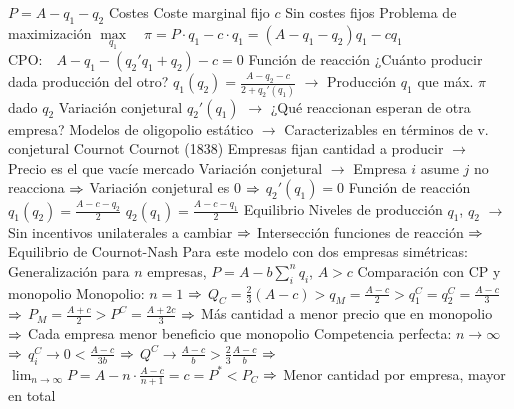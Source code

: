 \documentclass{nuevotema}
\begin{document}
\begin{esquemal}
				\4[] $P = A - q_1 - q_2$
				\4 Costes
				\4[] Coste marginal fijo $c$
				\4[] Sin costes fijos
				\4 Problema de maximización
				\4[] $\underset{q_1}{\max} \quad \pi = P \cdot q_1 - c\cdot q_1 = (A-q_1 - q_2) q_1 - c q_1 $
				\4[] $\text{CPO:} \quad A - q_1 - (q_2'q_1 + q_2) -c =0$
				\4 Función de reacción
				\4[] ¿Cuánto producir dada producción del otro?
				\4[] $q_1(q_2) = \frac{A - q_2 - c}{2 + q_2'(q_1)}$
				\4[] $\to$ Producción $q_1$ que máx. $\pi$ dado $q_2$
				\4 Variación conjetural $q_2'(q_1)$
				\4[] $\to$ ¿Qué reaccionan esperan de otra empresa?
				\4[$\then$] Modelos de oligopolio estático
				\4[] $\to$ Caracterizables en términos de v. conjetural
			\3 Cournot
				\4 Cournot (1838)
				\4 Empresas fijan cantidad a producir
				\4[] $\to$ Precio es el que vacíe mercado
				\4 Variación conjetural
				\4[] $\to$ Empresa $i$ asume $j$ no reacciona
				\4[] $\then$ Variación conjetural es 0
				\4[] $\then$ $q_2'(q_1) = 0$
				\4 Función de reacción
				\4[] $q_1(q_2) = \frac{A - c - q_2}{2}$
				\4[] $q_2(q_1) = \frac{A - c - q_1}{2}$
				\4[] 
				\4 Equilibrio
				\4[] Niveles de producción $q_1$, $q_2$
				\4[] $\to$ Sin incentivos unilaterales a cambiar
				\4[] $\then$ Intersección funciones de reacción
				\4[] $\then$ Equilibrio de Cournot-Nash
				\4[] Para este modelo con dos empresas simétricas:
				\4[] 
				\4[] 
				\4[] 
				\4[] Generalización para $n$ empresas, $P=A-b\sum_i^n q_i$, $A>c$
				\4[] 
				\4[] 
				\4[] 
				\4[] 
				\4[] 
				\4[] 
				\4 Comparación con CP y monopolio
				\4[] Monopolio: $n = 1$
				\4[] $\then$ $Q_C = \frac{2}{3} (A-c) > q_M = \frac{A-c}{2} > q_1^C = q_2^C = \frac{A-c}{3}$
				\4[] $\then$ $P_M = \frac{A+c}{2} > P^C = \frac{A+2c}{3} $
				\4[] $\then$ Más cantidad a menor precio que en monopolio
				\4[] $\then$ Cada empresa menor beneficio que monopolio
				\4[] Competencia perfecta: $n \to \infty$
				\4[] $\then$ $q_i^C \to 0 < \frac{A-c}{3b}$
				\4[] $\then$ $Q^C \to \frac{A-c}{b} > \frac{2}{3} \frac{A-c}{b}$
				\4[] $\then$ $\lim_{n \to \infty} P = A - n \cdot \frac{A-c}{n+1} = c = P^* < P_C$
				\4[] $\then$ Menor cantidad por empresa, mayor en total

\end{esquemal}
\end{document}
